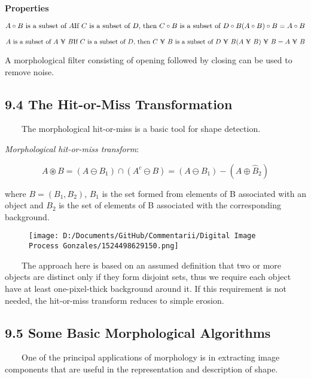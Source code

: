 \documentclass[]{article}
\begin{document}
\textbf{Properties}

\[A\circ B \text{ is a subset of }A\\
\text{If $C$ is a subset of $D$, then $C\circ B$ is a subset of $D\circ B$}\\
\text{$(A\circ B)\circ B=A\circ B$}\]

\[A\text{ is a subset of }A\ \yen\ B\\
\text{If $C$ is a subset of $D$, then $C\ \yen\ B$ is a subset of $D\ \yen\ B$}\\
\text{$(A\ \yen\ B)\ \yen\ B=A\ \yen\  B$}\]

A morphological filter consisting of opening followed by closing can be
used to remove noise.

\subsection{9.4 The Hit-or-Miss Transformation}\label{header-n191}

\(\quad\quad\)The morphological hit-or-miss is a basic tool for shape
detection.

\emph{Morphological hit-or-miss transform}:

\[A\circledast B=(A\ominus B_1)\cap(A^c\ominus B)=(A\ominus B_1)-(A\oplus\hat{B}_2)\]

where \(B=(B_1, B_2)\), \(B_1\) is the set formed from elements of B
associated with an object and \(B_2\) is the set of elements of B
associated with the corresponding background.

\begin{figure}
\centering
\texttt{[image: D:/Documents/GitHub/Commentarii/Digital Image Process Gonzales/1524498629150.png]}
\caption{}
\end{figure}

\(\quad\quad\)The approach here is based on an assumed definition that
two or more objects are distinct only if they form disjoint sets, thus
we require each object have at least one-pixel-thick background around
it. If this requirement is not needed, the hit-or-miss transform reduces
to simple erosion.

\subsection{9.5 Some Basic Morphological Algorithms}\label{header-n203}

\(\quad\quad\)One of the principal applications of morphology is in
extracting image components that are useful in the representation and
description of shape.
\end{document}
